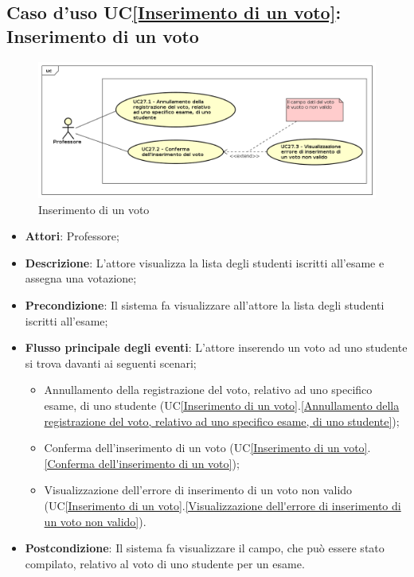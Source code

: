 \subsection{Caso d'uso UC\ref{Inserimento di un voto}: Inserimento di un voto }
\begin{figure} [H]
	\centering
	\includegraphics[scale=0.45]{./img/UseCaseDiagram027.png}
	\caption{Inserimento di un voto }\label{}
\end{figure}
\begin{itemize}
	\item \textbf{Attori}: Professore;
	\item \textbf{Descrizione}: L'attore visualizza la lista degli studenti iscritti all'esame e assegna una votazione;
	\item \textbf{Precondizione}: Il sistema fa visualizzare all'attore la lista degli studenti iscritti all'esame;
	\item \textbf{Flusso principale degli eventi}: L'attore inserendo un voto ad uno studente si trova davanti ai seguenti scenari;
	\begin{itemize}
		\item Annullamento della registrazione del voto, relativo ad uno specifico esame, di uno studente (UC\ref{Inserimento di un voto}.\ref{Annullamento della registrazione del voto, relativo ad uno specifico esame, di uno studente});
		\item Conferma dell'inserimento di un voto (UC\ref{Inserimento di un voto}.\ref{Conferma dell'inserimento di un voto});
		\item Visualizzazione dell'errore di inserimento di un voto non valido (UC\ref{Inserimento di un voto}.\ref{Visualizzazione dell'errore di inserimento di un voto non valido}).
	\end{itemize}
	\item \textbf{Postcondizione}: Il sistema fa visualizzare il campo, che può essere stato compilato, relativo al voto di uno studente per un esame.
\end{itemize}

